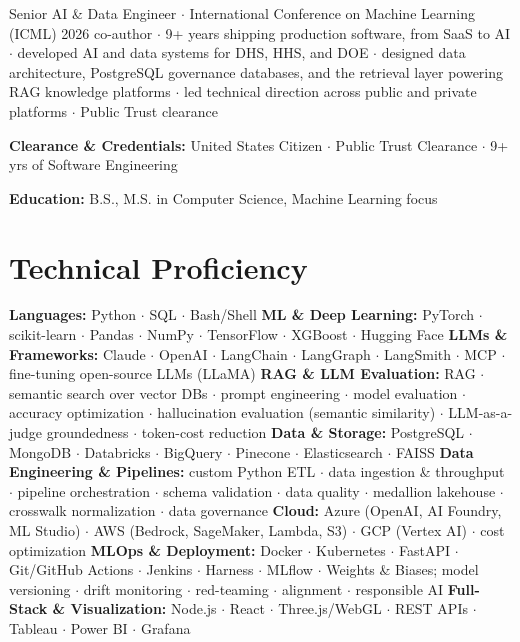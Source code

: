 \documentclass[10pt,a4paper,sans]{moderncv}
\begin{document}
\makecvtitle

\noindent
Senior AI \& Data Engineer $\cdot$ International Conference on Machine Learning (ICML) 2026 co-author $\cdot$ 9+ years shipping production software, from SaaS to AI $\cdot$ developed AI and data systems for DHS, HHS, and DOE $\cdot$ designed data architecture, PostgreSQL governance databases, and the retrieval layer powering RAG knowledge platforms $\cdot$ led technical direction across public and private platforms $\cdot$ Public Trust clearance
\vspace{6pt}

\noindent
\textbf{Clearance \& Credentials:} United States Citizen $\cdot$ Public Trust Clearance $\cdot$ 9+ yrs of Software Engineering

\noindent
\textbf{Education:} B.S., M.S. in Computer Science, Machine Learning focus
\vspace{4pt}

\section{Technical Proficiency}
\noindent
\textbf{Languages:} Python $\cdot$ SQL $\cdot$ Bash/Shell
\newline \noindent
\textbf{ML \& Deep Learning:} PyTorch $\cdot$ scikit-learn $\cdot$ Pandas $\cdot$ NumPy $\cdot$ TensorFlow $\cdot$ XGBoost $\cdot$ Hugging Face
\newline \noindent
\textbf{LLMs \& Frameworks:} Claude $\cdot$ OpenAI $\cdot$ LangChain $\cdot$ LangGraph $\cdot$ LangSmith $\cdot$ MCP $\cdot$ fine-tuning open-source LLMs (LLaMA)
\newline \noindent
\textbf{RAG \& LLM Evaluation:} RAG $\cdot$ semantic search over vector DBs $\cdot$ prompt engineering $\cdot$ model evaluation $\cdot$ accuracy optimization $\cdot$ hallucination evaluation (semantic similarity) $\cdot$ LLM-as-a-judge groundedness $\cdot$ token-cost reduction
\newline \noindent
\textbf{Data \& Storage:} PostgreSQL $\cdot$ MongoDB $\cdot$ Databricks $\cdot$ BigQuery $\cdot$ Pinecone $\cdot$ Elasticsearch $\cdot$ FAISS
\newline \noindent
\textbf{Data Engineering \& Pipelines:} custom Python ETL $\cdot$ data ingestion \& throughput $\cdot$ pipeline orchestration $\cdot$ schema validation $\cdot$ data quality $\cdot$ medallion lakehouse $\cdot$ crosswalk normalization $\cdot$ data governance
\newline \noindent
\textbf{Cloud:} Azure (OpenAI, AI Foundry, ML Studio) $\cdot$ AWS (Bedrock, SageMaker, Lambda, S3) $\cdot$ GCP (Vertex AI) $\cdot$ cost optimization
\newline \noindent
\textbf{MLOps \& Deployment:} Docker $\cdot$ Kubernetes $\cdot$ FastAPI $\cdot$ Git/GitHub Actions $\cdot$ Jenkins $\cdot$ Harness $\cdot$ MLflow $\cdot$ Weights \& Biases; model versioning $\cdot$ drift monitoring $\cdot$ red-teaming $\cdot$ alignment $\cdot$ responsible AI
\newline \noindent
\textbf{Full-Stack \& Visualization:} Node.js $\cdot$ React $\cdot$ Three.js/WebGL $\cdot$ REST APIs $\cdot$ Tableau $\cdot$ Power BI $\cdot$ Grafana
\end{document}
